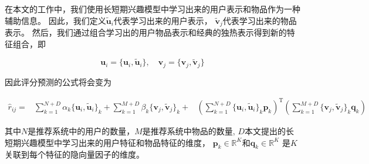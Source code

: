 在本文的工作中，我们使用长短期兴趣模型中学习出来的用户表示和物品作为一种辅助信息。
因此，我们定义$\tilde{\mathbf{u}}_i$代表学习出来的用户表示，
$\tilde{\mathbf{v}}_j$代表学习出来的物品表示。
然后，我们通过组合学习出的用户物品表示和经典的独热表示得到新的特征组合，即

\begin{equation}
\mathbf{u}_{i} = \{ \mathbf{u}_{i} , \tilde{\mathbf{u}}_i \} , \quad
\mathbf{v}_{j} = \{ \mathbf{v}_{j} , \tilde{\mathbf{v}}_j \}
\end{equation}

因此评分预测的公式将会变为

\begin{equation}
\begin{aligned}
\hat{r}_{ij} =
&\sum_{k=1}^{N+D} \alpha_k \{ \mathbf{u}_i , \tilde{\mathbf{u}}_i \}_k +
\sum_{k=1}^{M+D} \beta_k  \{ \mathbf{v}_j , \tilde{\mathbf{v}}_j \}_k + 
&\left( \sum_{k=1}^{N+D} \{ \mathbf{u}_i , \tilde{\mathbf{u}}_i \}_k \mathbf{p}_k \right) ^ \mathrm{T}
\left( \sum_{k=1}^{M+D} \{ \mathbf{v}_j , \tilde{\mathbf{v}}_j \}_k \mathbf{q}_k \right)
\end{aligned}
\end{equation}

其中$N$是推荐系统中的用户的数量，$M$是推荐系统中物品的数量,
$D$本文提出的长短期兴趣模型中学习出来的用户特征和物品特征的维度，
$\mathbf{p}_{k} \in \mathbb{R}^K$和$\mathbf{q}_{k} \in \mathbb{R}^K$
是$K$关联到每个特征的隐向量因子的维度。




